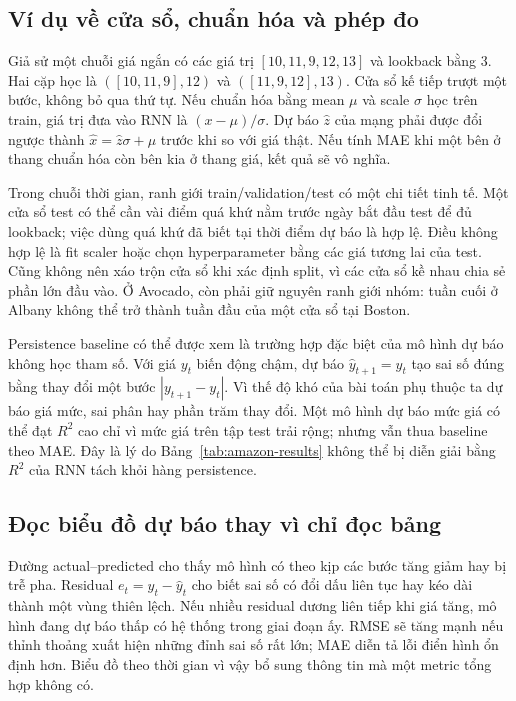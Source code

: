 \documentclass[12pt,a4paper]{report}
\begin{document}
\subsection{Ví dụ về cửa sổ, chuẩn hóa và phép đo}
Giả sử một chuỗi giá ngắn có các giá trị $[10,11,9,12,13]$ và lookback bằng 3. Hai cặp học là $([10,11,9],12)$ và $([11,9,12],13)$. Cửa sổ kế tiếp trượt một bước, không bỏ qua thứ tự. Nếu chuẩn hóa bằng mean $\mu$ và scale $\sigma$ học trên train, giá trị đưa vào RNN là $(x-\mu)/\sigma$. Dự báo $\hat z$ của mạng phải được đổi ngược thành $\hat x=\hat z\sigma+\mu$ trước khi so với giá thật. Nếu tính MAE khi một bên ở thang chuẩn hóa còn bên kia ở thang giá, kết quả sẽ vô nghĩa.

Trong chuỗi thời gian, ranh giới train/validation/test có một chi tiết tinh tế. Một cửa sổ test có thể cần vài điểm quá khứ nằm trước ngày bắt đầu test để đủ lookback; việc dùng quá khứ đã biết tại thời điểm dự báo là hợp lệ. Điều không hợp lệ là fit scaler hoặc chọn hyperparameter bằng các giá tương lai của test. Cũng không nên xáo trộn cửa sổ khi xác định split, vì các cửa sổ kề nhau chia sẻ phần lớn đầu vào. Ở Avocado, còn phải giữ nguyên ranh giới nhóm: tuần cuối ở Albany không thể trở thành tuần đầu của một cửa sổ tại Boston.

Persistence baseline có thể được xem là trường hợp đặc biệt của mô hình dự báo không học tham số. Với giá $y_t$ biến động chậm, dự báo $\hat y_{t+1}=y_t$ tạo sai số đúng bằng thay đổi một bước $|y_{t+1}-y_t|$. Vì thế độ khó của bài toán phụ thuộc ta dự báo giá mức, sai phân hay phần trăm thay đổi. Một mô hình dự báo mức giá có thể đạt $R^2$ cao chỉ vì mức giá trên tập test trải rộng; nhưng vẫn thua baseline theo MAE. Đây là lý do Bảng~\ref{tab:amazon-results} không thể bị diễn giải bằng $R^2$ của RNN tách khỏi hàng persistence.

\subsection{Đọc biểu đồ dự báo thay vì chỉ đọc bảng}
Đường actual--predicted cho thấy mô hình có theo kịp các bước tăng giảm hay bị trễ pha. Residual $e_t=y_t-\hat y_t$ cho biết sai số có đổi dấu liên tục hay kéo dài thành một vùng thiên lệch. Nếu nhiều residual dương liên tiếp khi giá tăng, mô hình đang dự báo thấp có hệ thống trong giai đoạn ấy. RMSE sẽ tăng mạnh nếu thỉnh thoảng xuất hiện những đỉnh sai số rất lớn; MAE diễn tả lỗi điển hình ổn định hơn. Biểu đồ theo thời gian vì vậy bổ sung thông tin mà một metric tổng hợp không có.
\end{document}
